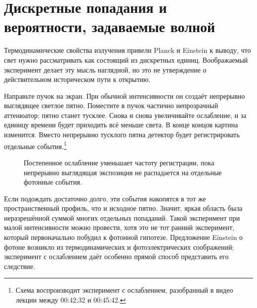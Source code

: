 \section{Дискретные попадания и вероятности, задаваемые волной}

Термодинамические свойства излучения привели Planck и Einstein к выводу, что свет нужно рассматривать как состоящий из дискретных единиц. Воображаемый эксперимент делает эту мысль наглядной, но это не утверждение о действительном историческом пути к открытию.

Направьте пучок на экран. При обычной интенсивности он создаёт непрерывно выглядящее светлое пятно. Поместите в пучок частично непрозрачный аттенюатор: пятно станет тусклее. Снова и снова увеличивайте ослабление, и за единицу времени будет приходить всё меньше света. В конце концов картина изменится. Вместо непрерывно тусклого пятна детектор будет регистрировать отдельные события.\footnote{Схема воспроизводит эксперимент с ослаблением, разобранный в видео лекции между 00:42:32 и 00:45:42.}

\begin{figure}[h]
\centering
{}
\caption{Постепенное ослабление уменьшает частоту регистрации, пока непрерывно выглядящая экспозиция не распадается на отдельные фотонные события.}
\end{figure}

Если подождать достаточно долго, эти события накопятся в тот же пространственный профиль, что и исходное пятно. Значит, яркая область была неразрешённой суммой многих отдельных попаданий. Такой эксперимент при малой интенсивности можно провести, хотя это не тот ранний эксперимент, который первоначально побудил к фотонной гипотезе. Предложение Einstein о фотоне возникло из термодинамических и фотоэлектрических соображений; эксперимент с ослаблением даёт особенно прямой способ представить его следствие.

